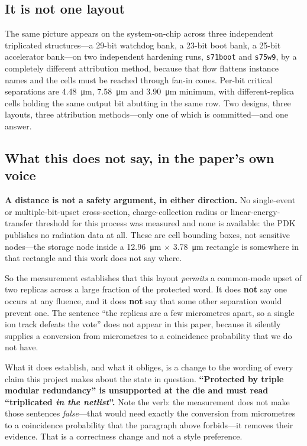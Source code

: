 \documentclass[11pt,a4paper]{article}
\begin{document}
\subsection{It is not one layout}

The same picture appears on the system-on-chip across three independent
triplicated structures---a 29-bit watchdog bank, a 23-bit boot bank, a
25-bit accelerator bank---on two independent hardening runs,
\texttt{s71boot} and \texttt{s75w9}, by a
completely different attribution method, because that flow flattens
instance names and the cells must be reached through fan-in cones.
Per-bit critical separations are \SI{4.48}{\micro\meter},
\SI{7.58}{\micro\meter} and \SI{3.90}{\micro\meter} minimum, with
different-replica cells holding the same output bit abutting in the same
row. Two designs, three layouts, three attribution methods---only one of
which is committed---and one answer.

\subsection{What this does not say, in the paper's own voice}

\textbf{A distance is not a safety argument, in either direction.} No
single-event or multiple-bit-upset cross-section, charge-collection
radius or linear-energy-transfer threshold for this process was measured
and none is available: the PDK publishes no radiation data at all. These
are cell bounding boxes, not sensitive nodes---the storage node inside a
\SI{12.96}{\micro\meter} $\times$ \SI{3.78}{\micro\meter} rectangle is
somewhere in that rectangle and this work does not say where.

So the measurement establishes that this layout \emph{permits} a
common-mode upset of two replicas across a large fraction of the
protected word. It does \textbf{not} say one occurs at any fluence, and
it does \textbf{not} say that some other separation would prevent one.
The sentence ``the replicas are a few micrometres apart, so a single ion
track defeats the vote'' does not appear in this paper, because it
silently supplies a conversion from micrometres to a coincidence
probability that we do not have.

What it does establish, and what it obliges, is a change to the wording
of every claim this project makes about the state in question.
\textbf{``Protected by triple modular redundancy'' is unsupported at the
die and must read ``triplicated \emph{in the netlist}''.} Note the verb:
the measurement does not make those sentences \emph{false}---that would
need exactly the conversion from micrometres to a coincidence probability
that the paragraph above forbids---it removes their evidence. That is a
correctness change and not a style preference.
\end{document}
